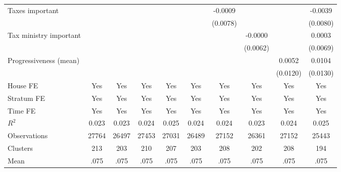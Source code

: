 {\begin{tabular}{l*{9}{c}}
Taxes important &                  &                  &                  &                  &                  &  -0.0009         &                  &                  &  -0.0039         \\
                &                  &                  &                  &                  &                  & (0.0078)         &                  &                  & (0.0080)         \\
Tax ministry important&                  &                  &                  &                  &                  &                  &  -0.0000         &                  &   0.0003         \\
                &                  &                  &                  &                  &                  &                  & (0.0062)         &                  & (0.0069)         \\
Progressiveness (mean)&                  &                  &                  &                  &                  &                  &                  &   0.0052         &   0.0104         \\
                &                  &                  &                  &                  &                  &                  &                  & (0.0120)         & (0.0130)         \\
House FE        &      Yes         &      Yes         &      Yes         &      Yes         &      Yes         &      Yes         &      Yes         &      Yes         &      Yes         \\
Stratum FE      &      Yes         &      Yes         &      Yes         &      Yes         &      Yes         &      Yes         &      Yes         &      Yes         &      Yes         \\
Time FE         &      Yes         &      Yes         &      Yes         &      Yes         &      Yes         &      Yes         &      Yes         &      Yes         &      Yes         \\
\hline
\(R^{2}\)       &    0.023         &    0.023         &    0.024         &    0.025         &    0.024         &    0.024         &    0.023         &    0.024         &    0.025         \\
Observations    &    27764         &    26497         &    27453         &    27031         &    26489         &    27152         &    26361         &    27152         &    25443         \\
Clusters        &      213         &      203         &      210         &      207         &      203         &      208         &      202         &      208         &      194         \\
Mean            &     .075         &     .075         &     .075         &     .075         &     .075         &     .075         &     .075         &     .075         &     .075         \\
\hline\hline
\end{tabular}
}
